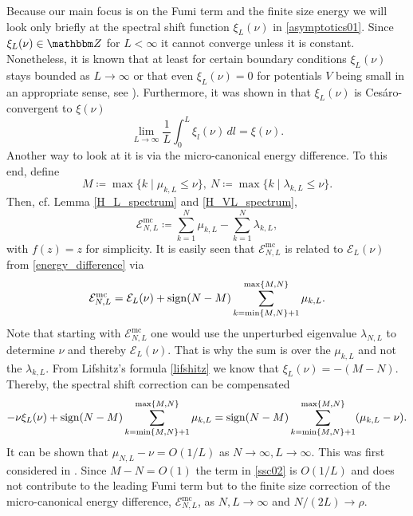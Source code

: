 Because our main focus is on the Fumi term and the finite size energy we will look only
briefly at the spectral shift function $\xi_L(\nu)$ in \eqref{asymptotics01}. 
Since $\xi_L(\nu)\in\Z$ for $L<\infty$ it cannot converge unless it is constant. 
Nonetheless, it is known that at least for certain boundary conditions
$\xi_L(\nu)$ stays bounded as $L\to\infty$ or that even $\xi_L(\nu)=0$ for potentials $V$ being small in an appropriate sense,
see \cite[Sec. 3.5]{KuettlerOtteSpitzer2014}). Furthermore, it was shown in \cite{BorovykMakarov2012} that $\xi_L(\nu)$
is Ces\'aro-convergent to $\xi(\nu)$
\begin{equation*}
  \lim_{L\to\infty} \frac{1}{L} \int_0^L \xi_l(\nu)\, dl = \xi(\nu) .
\end{equation*}
Another way to look at it is via the micro-canonical energy difference. To this end, define
\begin{equation}\label{ssc00}
  M \coloneqq \max\{ k \mid \mu_{k,L} \leq \nu \}, \ 
  N \coloneqq \max\{ k \mid \lambda_{k,L} \leq \nu \} .
\end{equation}
Then, cf. Lemma \ref{H_L_spectrum} and \eqref{H_VL_spectrum},
\begin{equation}\label{ssc01}
  \mathcal{E}^{\text{mc}}_{N,L} \coloneqq \sum_{k=1}^N\mu_{k,L} - \sum_{k=1}^N\lambda_{k,L} ,
\end{equation}
with $f(z)=z$ for simplicity.
It is easily seen that $\mathcal{E}^{\text{mc}}_{N,L}$ is related to $\mathcal{E}_L(\nu)$ from \eqref{energy_difference} via
\begin{equation*}
  \mathcal{E}^{\text{mc}}_{N,L}
     = \mathcal{E}_L(\nu) + \operatorname{sign}(N-M)\sum_{k=\min\{M,N\}+1}^{\max\{M,N\}}\mu_{k,L} .
\end{equation*}
Note that starting with $\mathcal{E}^{\text{mc}}_{N,L}$ one would use the unperturbed eigenvalue $\lambda_{N,L}$ 
to determine $\nu$ and thereby $\mathcal{E}_L(\nu)$. That is why the sum is over the $\mu_{k,L}$ and
not the $\lambda_{k,L}$.
From Lifshitz's formula \eqref{lifshitz} we know that $\xi_L(\nu) = -(M-N)$. Thereby, the spectral shift correction
can be compensated
\begin{equation}\label{ssc02}
  - \nu\xi_L(\nu) + \operatorname{sign}(N-M)\sum_{k=\min\{M,N\}+1}^{\max\{M,N\}}\mu_{k,L} 
     = \operatorname{sign}(N-M)\sum_{k=\min\{M,N\}+1}^{\max\{M,N\}} (\mu_{k,L}-\nu) .
\end{equation}
It can be shown that $\mu_{N,L}-\nu=O(1/L)$ as $N\to\infty,L\to\infty$.
This was first considered in \cite{FukudaNewton1956}. Since $M-N=O(1)$ the term in \eqref{ssc02}
is $O(1/L)$ and does not contribute to the leading Fumi term but to the finite size correction
of the micro-canonical energy difference, $\mathcal{E}^{\text{mc}}_{N,L}$, as $N,L\to\infty$ and $N/(2L)\to\rho$.
